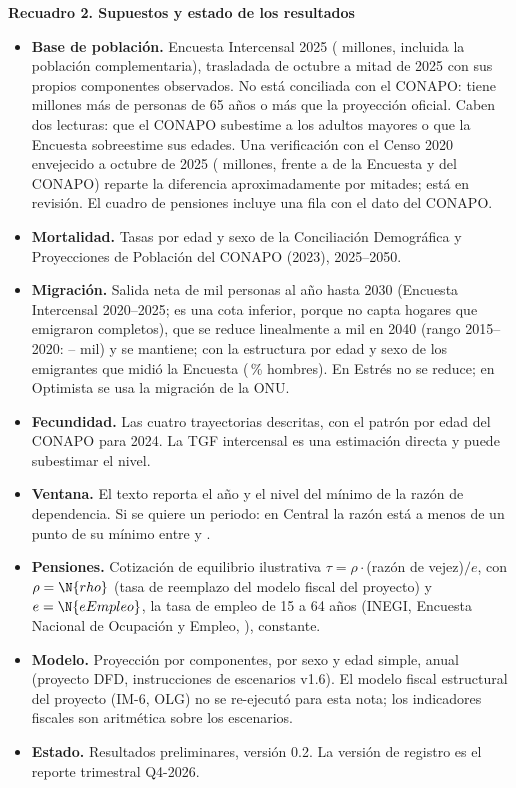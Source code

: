 \documentclass[10pt,a4paper]{article}
\newenvironment{recuadro}[1]
  {\par\vspace{2pt}\noindent\begin{lrbox}{\recbox}\begin{minipage}{\dimexpr\linewidth-2\fboxsep\relax}
   \setlength{\parskip}{2pt}\textbf{#1}\par}
  {\end{minipage}\end{lrbox}\colorbox{boxbg}{\usebox{\recbox}}\par\vspace{2pt}}
\begin{document}
\begin{recuadro}{Recuadro 2. Supuestos y estado de los resultados}
\scriptsize
\begin{itemize}
\item \textbf{Base de población.} Encuesta Intercensal 2025 ( millones, incluida la población
  complementaria), trasladada de octubre a mitad de 2025 con sus propios componentes observados. No
  está conciliada con el CONAPO: tiene  millones más de personas de 65 años o más
  que la proyección oficial. Caben dos lecturas: que el CONAPO subestime a los adultos mayores o que la
  Encuesta sobreestime sus edades. Una verificación con el Censo 2020 envejecido a octubre de 2025
  ( millones, frente a  de la Encuesta y  del CONAPO) reparte la
  diferencia aproximadamente por mitades; está en revisión. El cuadro de pensiones incluye una fila con
  el dato del CONAPO.
\item \textbf{Mortalidad.} Tasas por edad y sexo de la Conciliación Demográfica y Proyecciones de
  Población del CONAPO (2023), 2025--2050.
\item \textbf{Migración.} Salida neta de  mil personas al año hasta 2030 (Encuesta
  Intercensal 2020--2025; es una cota inferior, porque no capta hogares que emigraron completos), que
  se reduce linealmente a  mil en 2040 (rango 2015--2020: --
  mil) y se mantiene; con la estructura por edad y sexo de los emigrantes que midió la Encuesta
  (\,\% hombres). En Estrés no se reduce; en Optimista se usa la migración de la ONU.
\item \textbf{Fecundidad.} Las cuatro trayectorias descritas, con el patrón por edad del CONAPO para
  2024. La TGF intercensal es una estimación directa y puede subestimar el nivel.
\item \textbf{Ventana.} El texto reporta el año y el nivel del mínimo de la razón de dependencia. Si se
  quiere un periodo: en Central la razón está a menos de un punto de su mínimo entre
   y .
\item \textbf{Pensiones.} Cotización de equilibrio ilustrativa $\tau=\rho\cdot$(razón de vejez)$/e$, con
  $\rho=\N{rho}$ (tasa de reemplazo del modelo fiscal del proyecto) y $e=\N{eEmpleo}$, la tasa de empleo
  de 15 a 64 años (INEGI, Encuesta Nacional de Ocupación y Empleo, ), constante.
\item \textbf{Modelo.} Proyección por componentes, por sexo y edad simple, anual (proyecto DFD,
  instrucciones de escenarios v1.6). El modelo fiscal estructural del proyecto (IM-6, OLG) no se
  re-ejecutó para esta nota; los indicadores fiscales son aritmética sobre los escenarios.
\item \textbf{Estado.} Resultados preliminares, versión 0.2. La versión de registro es el reporte
  trimestral Q4-2026.
\end{itemize}
\end{recuadro}
\end{document}
